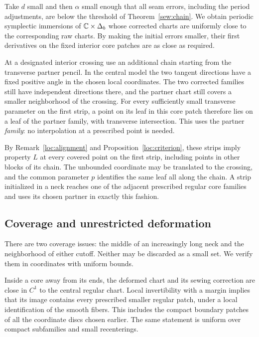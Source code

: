 Take $d$ small and then $\alpha$ small enough that all seam
errors, including the period adjustments, are below the threshold
of Theorem~\ref{sew:chain}.  We obtain periodic symplectic
immersions of $\mathbb C\times\Delta_b$ whose corrected charts are
uniformly close to the corresponding raw charts.  By making the
initial errors smaller, their first derivatives on the fixed
interior core patches are as close as required.

At a designated interior crossing use an additional chain starting
from the transverse partner pencil.  In the central model the
two tangent directions have a fixed positive angle in the chosen
local coordinates.  The two corrected families still have
independent directions there, and the partner chart still covers
a smaller neighborhood of the crossing.  For every sufficiently
small transverse parameter on the first strip, a point on its
leaf in this core patch therefore lies on a leaf of the partner
family, with transverse intersection.  This uses the partner
\emph{family}: no interpolation at a prescribed point is needed.

By Remark~\ref{loc:alignment} and Proposition~\ref{loc:criterion},
these strips imply property $L$ at every covered point on the
first strip, including points in other blocks of its chain.
The unbounded coordinate may be translated to the crossing,
and the common parameter $p$ identifies the same leaf all along
the chain.  A strip initialized in a neck reaches one of the
adjacent prescribed regular core families and uses its chosen
partner in exactly this fashion.

\subsection{Coverage and unrestricted deformation}

There are two coverage issues: the middle of an increasingly long
neck and the neighborhood of either cutoff.  Neither may be
discarded as a small set.  We verify them in coordinates with
uniform bounds.

Inside a core away from its ends, the deformed chart and its
sewing correction are close in $C^1$ to the central regular
chart.  Local invertibility with a margin implies that its image
contains every prescribed smaller regular patch, under a local
identification of the smooth fibers.  This includes the compact
boundary patches of all the coordinate discs chosen earlier.
The same statement is uniform over compact subfamilies and
small recenterings.

